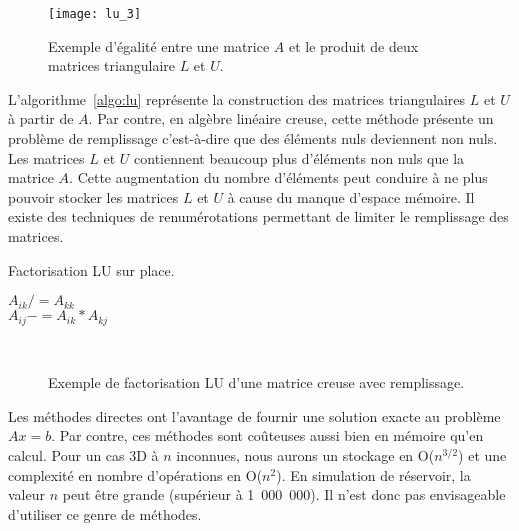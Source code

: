 \begin{figure}[!h]
  \centering
  \texttt{[image: lu\_3]}
  \caption{Exemple d'égalité entre une matrice $A$ et le produit de deux matrices triangulaire $L$ et $U$.}
  \label{fig:lu_3}
\end{figure}


L'algorithme~\ref{algo:lu} représente la construction des matrices triangulaires $L$ et $U$ à partir de $A$.
%
Par contre, en algèbre linéaire creuse, cette méthode présente un problème de remplissage c'est-à-dire que des éléments nuls deviennent non nuls.
%
Les matrices $L$ et $U$ contiennent beaucoup plus d'éléments non nuls que la matrice $A$.
%
Cette augmentation du nombre d'éléments peut conduire à ne plus pouvoir stocker les matrices $L$ et $U$ à cause du manque d'espace mémoire.
%
Il existe des techniques de renumérotations permettant de limiter le remplissage des matrices\cite{faverge_thesis}.

\begin{algorithm}
  \caption{Factorisation LU sur place.}
  \label{algo:lu}
   {
     {
      $A_{ik} /= A_{kk}$ \\
       {
        $A_{ij} -= A_{ik}*A_{kj}$
      }
    }
  }
\end{algorithm}

\begin{figure}[!h]
     \begin{center}
        ~
    \end{center}
    \caption{Exemple de factorisation LU d'une matrice creuse avec remplissage.}
    \label{fig:lu_example}
\end{figure}

Les méthodes directes ont l'avantage de fournir une solution exacte au problème $Ax=b$.
%
Par contre, ces méthodes sont coûteuses aussi bien en mémoire qu'en calcul.
%
Pour un cas 3D à $n$ inconnues, nous aurons un stockage en O($n^{3/2}$) et une complexité en nombre d'opérations en O($n^2$).
%
En simulation de réservoir, la valeur $n$ peut être grande (supérieur à 1~000~000).
%
Il n'est donc pas envisageable d'utiliser ce genre de méthodes.
